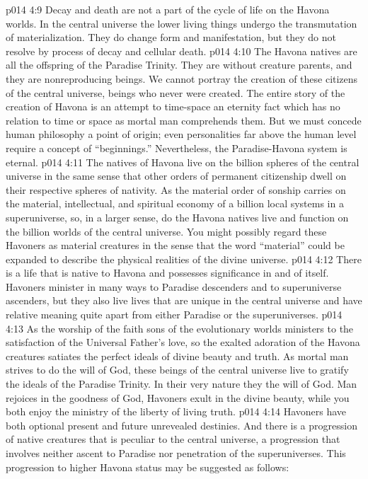 \vs p014 4:9 \pc Decay and death are not a part of the cycle of life on the Havona worlds. In the central universe the lower living things undergo the transmutation of materialization. They do change form and manifestation, but they do not resolve by process of decay and cellular death.
\vs p014 4:10 \pc The Havona natives are all the offspring of the Paradise Trinity. They are without creature parents, and they are nonreproducing beings. We cannot portray the creation of these citizens of the central universe, beings who never were created. The entire story of the creation of Havona is an attempt to time\hyp{}space an eternity fact which has no relation to time or space as mortal man comprehends them. But we must concede human philosophy a point of origin; even personalities far above the human level require a concept of “beginnings.” Nevertheless, the Paradise\hyp{}Havona system is eternal.
\vs p014 4:11 The natives of Havona live on the billion spheres of the central universe in the same sense that other orders of permanent citizenship dwell on their respective spheres of nativity. As the material order of sonship carries on the material, intellectual, and spiritual economy of a billion local systems in a superuniverse, so, in a larger sense, do the Havona natives live and function on the billion worlds of the central universe. You might possibly regard these Havoners as material creatures in the sense that the word “material” could be expanded to describe the physical realities of the divine universe.
\vs p014 4:12 There is a life that is native to Havona and possesses significance in and of itself. Havoners minister in many ways to Paradise descenders and to superuniverse ascenders, but they also live lives that are unique in the central universe and have relative meaning quite apart from either Paradise or the superuniverses.
\vs p014 4:13 As the worship of the faith sons of the evolutionary worlds ministers to the satisfaction of the Universal Father’s love, so the exalted adoration of the Havona creatures satiates the perfect ideals of divine beauty and truth. As mortal man strives to do the will of God, these beings of the central universe live to gratify the ideals of the Paradise Trinity. In their very nature they  the will of God. Man rejoices in the goodness of God, Havoners exult in the divine beauty, while you both enjoy the ministry of the liberty of living truth.
\vs p014 4:14 Havoners have both optional present and future unrevealed destinies. And there is a progression of native creatures that is peculiar to the central universe, a progression that involves neither ascent to Paradise nor penetration of the superuniverses. This progression to higher Havona status may be suggested as follows:
